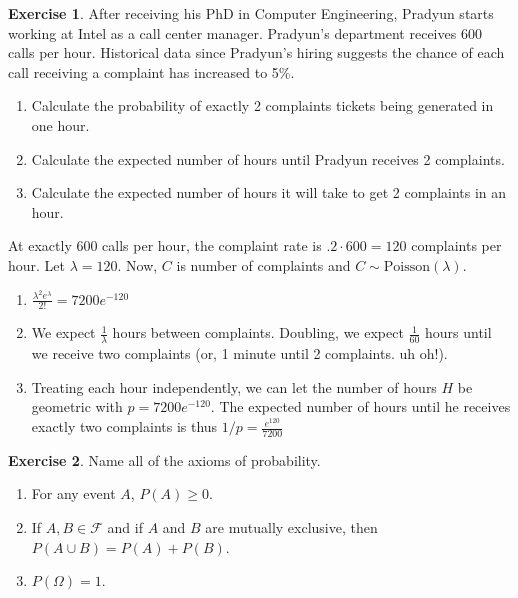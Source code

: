 \documentclass[12pt]{amsart}
\theoremstyle{definition}
\newtheorem{exercise}{Exercise}
\numberwithin{equation}{section}
\theoremstyle{plain}
\newcommand{\Poisson}{\text{Poisson}}
\begin{document}
\begin{exercise}
    After receiving his PhD in Computer Engineering, Pradyun starts working at Intel as a call center manager. Pradyun's department receives 600 calls per hour. Historical data since Pradyun's hiring suggests the chance of each call receiving a complaint has increased to 5\%. 
    \begin{enumerate}
    \item Calculate the probability of exactly 2 complaints tickets being generated in one hour. 
    \item Calculate the expected number of hours until Pradyun receives 2 complaints.
    \item Calculate the expected number of hours it will take to get 2 complaints in an hour.
    \end{enumerate}
    \begin{answer}
        At exactly $600$ calls per hour, the complaint rate is $.2\cdot 600 = 120$ complaints per hour. Let $\lambda = 120$. Now, $C$ is number of complaints and $C \sim \Poisson(\lambda)$.
        \begin{enumerate}
            \item $\frac{\lambda^2 e^{\lambda}}{2!} = 7200e^{-120}$
            \item We expect $\frac{1}{\lambda}$ hours between complaints. Doubling, we expect $\frac{1}{60}$ hours until we receive two complaints (or, 1 minute until 2 complaints. uh oh!).
            \item Treating each hour independently, we can let the number of hours $H$ be geometric with $p = 7200e^{-120}$. The expected number of hours until he receives exactly two complaints is thus $1/p = \frac{e^{120}}{7200}$
        \end{enumerate}
    \end{answer}
\end{exercise}

 

\begin{exercise}
Name all of the axioms of probability.
\begin{answer}
    \begin{enumerate}
        \item For any event $A$, $P(A) \geq 0$.
        \item If $A, B \in \mathcal{F}$ and if $A$ and $B$ are mutually exclusive, then $P(A \cup B) = P(A) + P(B)$.
        \item $P(\Omega) = 1$.
    \end{enumerate}
\end{answer}
\end{exercise}
\end{document}
